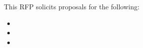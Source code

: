 This RFP solicits proposals for the following:
\begin{itemize}
\item    {}
\item    {}
\item    {}
\end{itemize}
